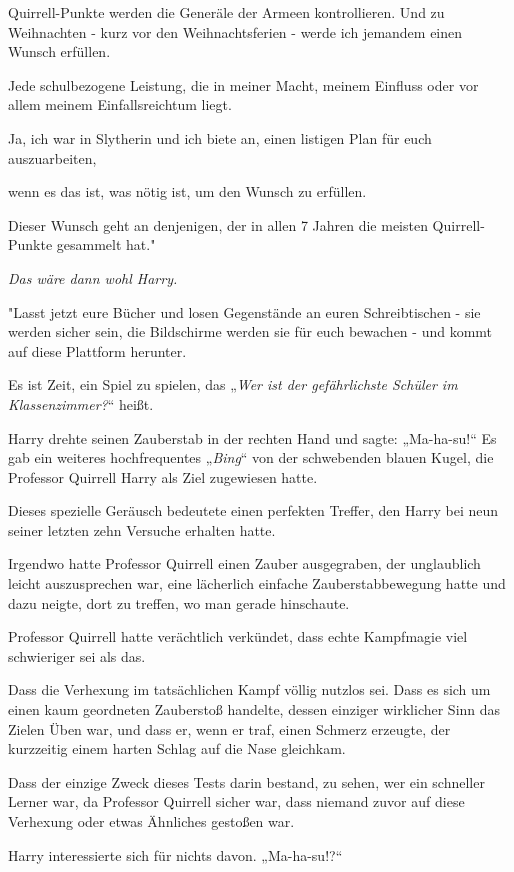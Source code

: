{Quirrell-Punkte werden die Generäle der Armeen kontrollieren. Und zu Weihnachten - kurz vor den Weihnachtsferien - werde ich jemandem einen Wunsch erfüllen.

Jede schulbezogene Leistung, die in meiner Macht, meinem Einfluss oder vor allem meinem Einfallsreichtum liegt.

Ja, ich war in Slytherin und ich biete an, einen listigen Plan für euch auszuarbeiten,

wenn es das ist, was nötig ist, um den Wunsch zu erfüllen.

Dieser Wunsch geht an denjenigen, der in allen 7 Jahren die meisten Quirrell-Punkte gesammelt hat."

\emph{Das wäre dann wohl Harry.}

"Lasst jetzt eure Bücher und losen Gegenstände an euren Schreibtischen - sie werden sicher sein, die Bildschirme werden sie für euch bewachen - und kommt auf diese Plattform herunter.

Es ist Zeit, ein Spiel zu spielen, das „\emph{Wer ist der gefährlichste Schüler im Klassenzimmer?}“ heißt.

Harry drehte seinen Zauberstab in der rechten Hand und sagte: „Ma-ha-su!“ Es gab ein weiteres hochfrequentes „\emph{Bing}“ von der schwebenden blauen Kugel, die Professor Quirrell Harry als Ziel zugewiesen hatte.

Dieses spezielle Geräusch bedeutete einen perfekten Treffer, den Harry bei neun seiner letzten zehn Versuche erhalten hatte.

Irgendwo hatte Professor Quirrell einen Zauber ausgegraben, der unglaublich leicht auszusprechen war, eine lächerlich einfache Zauberstabbewegung hatte und dazu neigte, dort zu treffen, wo man gerade hinschaute.

Professor Quirrell hatte verächtlich verkündet, dass echte Kampfmagie viel schwieriger sei als das.

Dass die Verhexung im tatsächlichen Kampf völlig nutzlos sei. Dass es sich um einen kaum geordneten Zauberstoß handelte, dessen einziger wirklicher Sinn das Zielen Üben war, und dass er, wenn er traf, einen Schmerz erzeugte, der kurzzeitig einem harten Schlag auf die Nase gleichkam.

Dass der einzige Zweck dieses Tests darin bestand, zu sehen, wer ein schneller Lerner war, da Professor Quirrell sicher war, dass niemand zuvor auf diese Verhexung oder etwas Ähnliches gestoßen war.

Harry interessierte sich für nichts davon. „Ma-ha-su!?“

}
